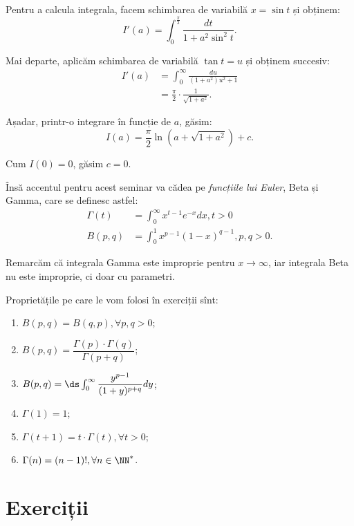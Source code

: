 Pentru a calcula integrala, facem schimbarea de variabilă $ x = \sin t $ și obținem:
\[
  I'(a) = \int_0^{\frac{\pi}{2}} \frac{dt}{1 + a^2 \sin^2 t}.
\]

Mai departe, aplicăm schimbarea de variabilă $ \tan t = u $ și obținem succesiv:
\begin{align*}
  I'(a) &= \int_0^\infty \frac{du}{(1 + a^2)u^2 + 1} \\
        &= \frac{\pi}{2} \cdot \frac{1}{\sqrt{1 + a^2}}.
\end{align*}

Așadar, printr-o integrare în funcție de $ a $, găsim:
\[
  I(a) = \frac{\pi}{2} \ln(a + \sqrt{1 + a^2}) + c.
\]

Cum $ I(0) = 0 $, găsim $ c = 0 $.

\vspace{0.5cm}

Însă accentul pentru acest seminar va cădea pe \emph{funcțiile lui Euler},
Beta și Gamma, care se definesc astfel:
\begin{align*}
    \Gamma(t) &= \int_0^\infty x^{t - 1} e^{-x} dx, t > 0 \\
    B(p,q) &= \int_0^1 x^{p-1}(1 - x)^{q-1}, p, q > 0.
\end{align*}

Remarcăm că integrala Gamma este improprie pentru $ x \to \infty $,
iar integrala Beta nu este improprie, ci doar cu parametri.

Proprietățile pe care le vom folosi în exerciții sînt:
\begin{enumerate}[(1)]
    \item $ B(p, q) = B(q, p), \forall p, q > 0 $;
    \item $ B(p, q) = \dfrac{\Gamma(p) \cdot \Gamma(q)}{\Gamma(p + q)} $;
    \item $ B(p, q) = \ds\int_0^\infty \dfrac{y^{p-1}}{(1 + y)^{p + q}} dy $;
    \item $ \Gamma(1) = 1 $;
    \item $ \Gamma(t + 1) = t \cdot \Gamma(t), \forall t > 0 $;
    \item $ \Gamma(n) = (n - 1)!, \forall n \in \NN^\ast $.
\end{enumerate}

\section{Exerciții}

